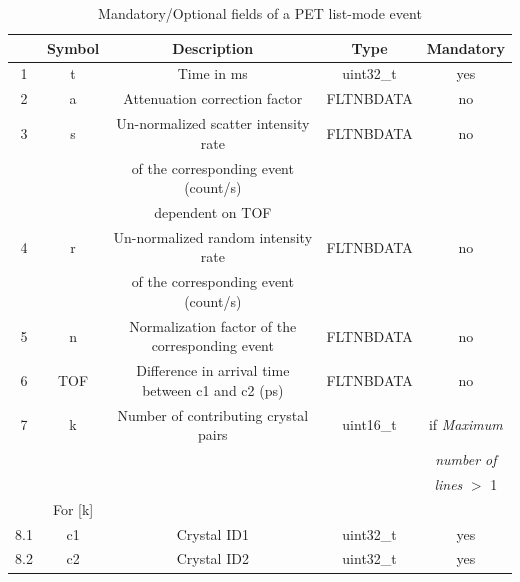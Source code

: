 \documentclass[a4paper, 11pt]{article}
\begin{document}
\begin{table} [h!]
  \small
  \caption{Mandatory/Optional fields of a PET list-mode event}
  \label{table_PET_data_bin_list-mode}
  \begin{center}
  \begin{tabular}{|c|c|c|c|c|}
  \hline
   & \textbf{Symbol} & \textbf{Description} & \textbf{Type} & \textbf{Mandatory}\\
  \hline
  \hline
  1 & t & Time in ms & uint32\_t & yes \\ \hline
  2 & a & Attenuation correction factor & FLTNBDATA & no \\ \hline
  3 & s & Un-normalized scatter intensity rate & FLTNBDATA & no \\
    & &  of the corresponding event (count/s) &  & \\
    & &  dependent on TOF &  & \\ \hline
  4 & r & Un-normalized random intensity rate & FLTNBDATA & no \\
    & & of the corresponding event (count/s) & & \\ \hline
  5 & n & Normalization factor of the corresponding event & FLTNBDATA & no \\ \hline
  6 & TOF & Difference in arrival time between c1 and c2 (ps) & FLTNBDATA & no \\ \hline
  7 & k & Number of contributing crystal pairs & uint16\_t & if \textit{Maximum} \\
    & & & &                                                     \textit{number of} \\
    & & & &                                                     \textit{lines} $>$ 1 \\ \hline
  \cellcolor{blue!25}& \cellcolor{blue!25}For [k]&\cellcolor{blue!25}&\cellcolor{blue!25}&\cellcolor{blue!25} \\ \hline
  8.1 & c1 & Crystal ID1 & uint32\_t & yes \\ \hline
  8.2 & c2 & Crystal ID2 & uint32\_t & yes \\ \hline

\end{tabular}
\end{center}
\end{table}
\end{document}
